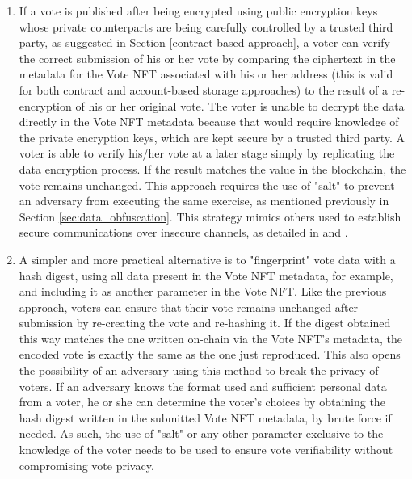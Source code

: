 \documentclass[../main.tex]{subfiles}
\begin{document}
\begin{enumerate}
    \item{If a vote is published after being encrypted using public encryption keys whose private counterparts are being carefully controlled by a trusted third party, as suggested in Section \ref{contract-based-approach}, a voter can verify the correct submission of his or her vote by comparing the ciphertext in the metadata for the Vote NFT associated with his or her address (this is valid for both contract and account-based storage approaches) to the result of a re-encryption of his or her original vote. The voter is unable to decrypt the data directly in the Vote NFT metadata because that would require knowledge of the private encryption keys, which are kept secure by a trusted third party. A voter is able to verify his/her vote at a later stage simply by replicating the data encryption process. If the result matches the value in the blockchain, the vote remains unchanged. This approach requires the use of "salt" to prevent an adversary from executing the same exercise, as mentioned previously in Section \ref{sec:data_obfuscation}. This strategy mimics others used to establish secure communications over insecure channels, as detailed in \cite{Merkle1978} and \cite{Merkle1980}}.

    \item{A simpler and more practical alternative is to "fingerprint" vote data with a hash digest, using all data present in the Vote NFT metadata, for example, and including it as another parameter in the Vote NFT. Like the previous approach, voters can ensure that their vote remains unchanged after submission by re-creating the vote and re-hashing it. If the digest obtained this way matches the one written on-chain via the Vote NFT's metadata, the encoded vote is exactly the same as the one just reproduced. This also opens the possibility of an adversary using this method to break the privacy of voters. If an adversary knows the format used and sufficient personal data from a voter, he or she can determine the voter's choices by obtaining the hash digest written in the submitted Vote NFT metadata, by brute force if needed. As such, the use of "salt" or any other parameter exclusive to the knowledge of the voter needs to be used to ensure vote verifiability without compromising vote privacy.}
\end{enumerate}
\end{document}

